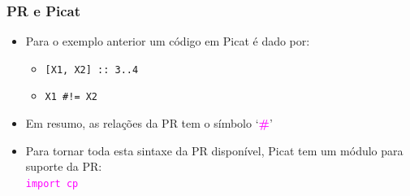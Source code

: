 \begin{frame}[fragile]
\frametitle{PR e Picat}

\begin{block}{}

\begin{itemize}
    \item Para o exemplo anterior um  código em Picat é dado por:
      \pause
    \begin{itemize}
        \item \texttt{[X1, X2] :: 3..4}
        \item \texttt{X1 \#!= X2} 
     \end{itemize}  
      
      \pause
     \item Em resumo, as relações da PR tem o símbolo `\textbf{\textcolor{magenta}{{\#}}}' 

  \pause
  \item Para tornar toda esta sintaxe da PR disponível, Picat 
        tem um módulo para suporte da PR:\\
         \textcolor{magenta}{\texttt{import cp}}
    
\end{itemize}

\end{block}
    
\end{frame}

